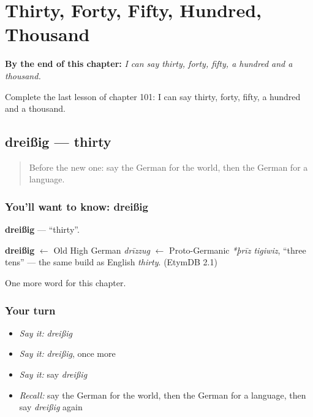 
\chapter{Thirty, Forty, Fifty, Hundred, Thousand}
\label{ch:ge-thirty-forty-fifty-hundred-thousand}

\begin{chapteropening}
\textbf{By the end of this chapter:} \emph{I can say thirty, forty, fifty, a hundred and a thousand.}

Complete the last lesson of chapter 101: I can say thirty, forty, fifty, a hundred and a thousand.
\end{chapteropening}

\section[dreißig]{dreißig — thirty}

\label{lesson:GE-C101-dreissig}



\begin{quote}
Before the new one: say the German for the world, then the German for a language.
\end{quote}

\subsection*{You'll want to know: dreißig}
\textbf{dreißig} — \textquotedblleft{}thirty\textquotedblright{}.

\begin{cousinweb}
\textbf{dreißig} $\leftarrow$ Old High German \emph{drīzzug} $\leftarrow$ Proto-Germanic \emph{*þrīz tigiwiz}, \textquotedblleft{}three tens\textquotedblright{} — the same build as English \emph{thirty}. (EtymDB 2.1)
\end{cousinweb}

\begin{grammarlens}[title={What you've built}]
One more word for this chapter.
\end{grammarlens}

\subsection*{Your turn}
\begin{itemize}
\raggedright
  \item \emph{Say it:} \emph{dreißig}
  \item \emph{Say it:} \emph{dreißig}, once more
  \item \emph{Say it:} say \emph{dreißig}
  \item \emph{Recall:} say the German for the world, then the German for a language, then say \emph{dreißig} again
\end{itemize}


